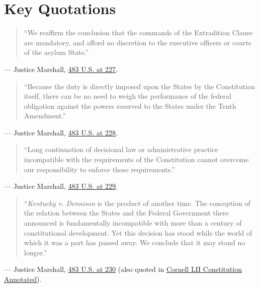 \documentclass[12pt]{article}
\begin{document}
\section{Key Quotations}
\begin{quote}
``We reaffirm the conclusion that the commands of the Extradition Clause are mandatory, and afford no discretion to the executive officers or courts of the asylum State.''
\end{quote}
\noindent --- Justice Marshall, \href{https://supreme.justia.com/cases/federal/us/483/219/}{483 U.S. at 227}.

\begin{quote}
``Because the duty is directly imposed upon the States by the Constitution itself, there can be no need to weigh the performance of the federal obligation against the powers reserved to the States under the Tenth Amendment.''
\end{quote}
\noindent --- Justice Marshall, \href{https://supreme.justia.com/cases/federal/us/483/219/}{483 U.S. at 228}.

\begin{quote}
``Long continuation of decisional law or administrative practice incompatible with the requirements of the Constitution cannot overcome our responsibility to enforce those requirements.''
\end{quote}
\noindent --- Justice Marshall, \href{https://supreme.justia.com/cases/federal/us/483/219/}{483 U.S. at 229}.

\begin{quote}
``\emph{Kentucky v. Dennison} is the product of another time. The conception of the relation between the States and the Federal Government there announced is fundamentally incompatible with more than a century of constitutional development. Yet this decision has stood while the world of which it was a part has passed away. We conclude that it may stand no longer.''
\end{quote}
\noindent --- Justice Marshall, \href{https://supreme.justia.com/cases/federal/us/483/219/}{483 U.S. at 230} (also quoted in \href{https://www.law.cornell.edu/constitution-conan/article-4/section-2/clause-2/overview-of-extradition-interstate-rendition-clause}{Cornell LII Constitution Annotated}).
\end{document}
